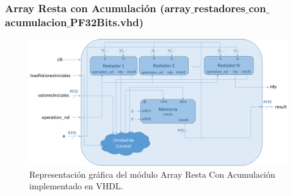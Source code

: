 \subsubsection{Array Resta con Acumulación (array$\_$restadores$\_$con$\_$acumulacion$\_$PF32Bits.vhd)}

\begin{figure}
  \centering
    \includegraphics[width=1\textwidth]{Imagenes/DiagramaModuloArrayRestaConAcumulacion.png}
  \caption{Representación gráfica del módulo Array Resta Con Acumulación implementado en VHDL.}
  \label{fig:modulo array resta con acumulacion vhdl}
\end{figure}

